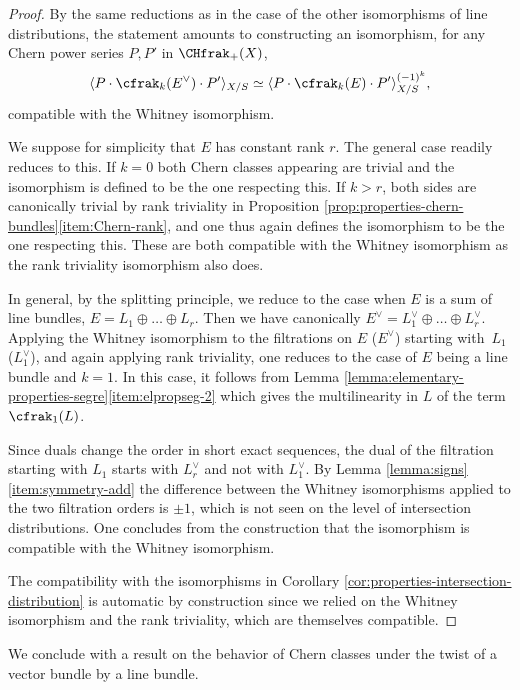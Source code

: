 \begin{proof}
By the same reductions as in the case of the other isomorphisms of line distributions, the statement amounts to constructing an isomorphism, for any Chern power series $P, P'$ in $\CHfrak_+(X)$,
\begin{displaymath}
\langle P \cdot \cfrak_k(E^\vee) \cdot P' \rangle_{X/S} \simeq \langle P \cdot \cfrak_k(E) \cdot P' \rangle_{X/S}^{(-1)^k},
\end{displaymath}
compatible with the Whitney isomorphism.

We suppose for simplicity that $E$ has constant rank $r$. The general case readily reduces to this. If $k = 0$ both Chern classes appearing are trivial and the isomorphism is defined to be the one respecting this. If $k>r$, both sides are canonically trivial by rank triviality in Proposition \ref{prop:properties-chern-bundles}\eqref{item:Chern-rank}, and one thus again defines the isomorphism to be the one respecting this. These are both compatible with the Whitney isomorphism as the rank triviality isomorphism also does.

In general, by the splitting principle, we reduce to the case when $E$ is a sum of line bundles, $E = L_1 \oplus \ldots \oplus L_r$. Then we have canonically $E^\vee = L_1^\vee \oplus \ldots \oplus L_r^\vee$. Applying the Whitney isomorphism to the filtrations on $E$ (\resp $E^\vee$) starting with~$L_1$ (\resp $L_1^\vee$), and again applying rank triviality, one reduces to the case of $E$ being a line bundle and $k = 1$. In this case, it follows from Lemma \ref{lemma:elementary-properties-segre}\eqref{item:elpropseg-2} which gives the multilinearity in $L$ of the term $\cfrak_1(L)$.

Since duals change the order in short exact sequences, the dual of the filtration starting with $L_1$ starts with $L_r^\vee$ and not with $L_1^\vee$. By Lemma \ref{lemma:signs}\eqref{item:symmetry-add} the difference between the Whitney isomorphisms applied to the two filtration orders is $\pm 1$, which is not seen on the level of intersection distributions. One concludes from the construction that the isomorphism is compatible with the Whitney isomorphism.

The compatibility with the isomorphisms in Corollary \ref{cor:properties-intersection-distribution} is automatic by construction since we relied on the Whitney isomorphism and the rank triviality, which are themselves compatible.
\end{proof}

We conclude with a result on the behavior of Chern classes under the twist of a vector bundle by a line bundle.


